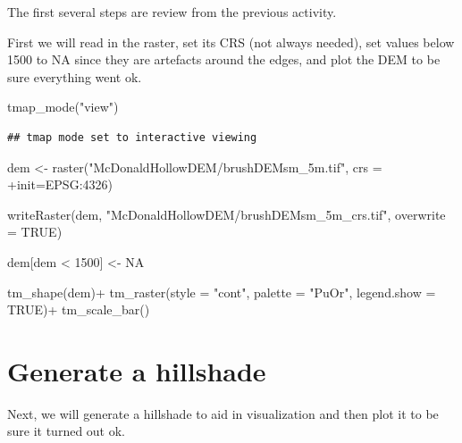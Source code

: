 \documentclass[
]{book}
\newenvironment{Shaded}{\begin{snugshade}}{\end{snugshade}}
\newcommand{\AttributeTok}[1]{\textcolor[rgb]{0.77,0.63,0.00}{#1}}
\newcommand{\ConstantTok}[1]{\textcolor[rgb]{0.00,0.00,0.00}{#1}}
\newcommand{\DecValTok}[1]{\textcolor[rgb]{0.00,0.00,0.81}{#1}}
\newcommand{\FunctionTok}[1]{\textcolor[rgb]{0.00,0.00,0.00}{#1}}
\newcommand{\NormalTok}[1]{#1}
\newcommand{\OtherTok}[1]{\textcolor[rgb]{0.56,0.35,0.01}{#1}}
\newcommand{\SpecialCharTok}[1]{\textcolor[rgb]{0.00,0.00,0.00}{#1}}
\newcommand{\StringTok}[1]{\textcolor[rgb]{0.31,0.60,0.02}{#1}}
\begin{document}
The first several steps are review from the previous activity.

First we will read in the raster, set its CRS (not always needed), set values below 1500 to NA since they are artefacts around the edges, and plot the DEM to be sure everything went ok.

\begin{Shaded}
\begin{Highlighting}[]
\FunctionTok{tmap\_mode}\NormalTok{(}\StringTok{"view"}\NormalTok{)}
\end{Highlighting}
\end{Shaded}

\begin{verbatim}
## tmap mode set to interactive viewing
\end{verbatim}

\begin{Shaded}
\begin{Highlighting}[]
\NormalTok{dem }\OtherTok{\textless{}{-}} \FunctionTok{raster}\NormalTok{(}\StringTok{"McDonaldHollowDEM/brushDEMsm\_5m.tif"}\NormalTok{, }\AttributeTok{crs =} \StringTok{\textquotesingle{}+init=EPSG:4326\textquotesingle{}}\NormalTok{)}

\FunctionTok{writeRaster}\NormalTok{(dem, }\StringTok{"McDonaldHollowDEM/brushDEMsm\_5m\_crs.tif"}\NormalTok{, }\AttributeTok{overwrite =} \ConstantTok{TRUE}\NormalTok{)}

\NormalTok{dem[dem }\SpecialCharTok{\textless{}} \DecValTok{1500}\NormalTok{] }\OtherTok{\textless{}{-}} \ConstantTok{NA}

\FunctionTok{tm\_shape}\NormalTok{(dem)}\SpecialCharTok{+}
  \FunctionTok{tm\_raster}\NormalTok{(}\AttributeTok{style =} \StringTok{"cont"}\NormalTok{, }\AttributeTok{palette =} \StringTok{"PuOr"}\NormalTok{, }\AttributeTok{legend.show =} \ConstantTok{TRUE}\NormalTok{)}\SpecialCharTok{+}
  \FunctionTok{tm\_scale\_bar}\NormalTok{()}
\end{Highlighting}
\end{Shaded}

\hypertarget{generate-a-hillshade-1}{%
\section{Generate a hillshade}\label{generate-a-hillshade-1}}

Next, we will generate a hillshade to aid in visualization and then plot it to be sure it turned out ok.
\end{document}
